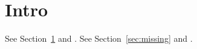 \documentclass{article}
\begin{document}
\section{Intro}\label{sec:intro}
See Section~\ref{sec:intro} and \cite{knuth}.
See Section~\ref{sec:missing} and \cite{missing-key}.


\end{document}
